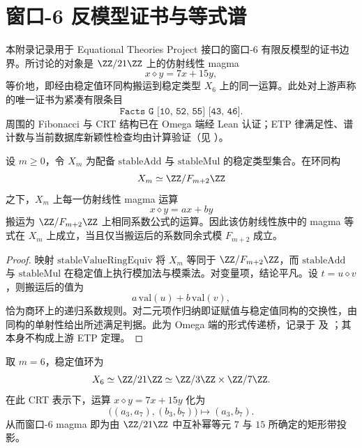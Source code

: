 \documentclass[../../main.tex]{subfiles}
\begin{document}
\section{窗口-6 反模型证书与等式谱}\label{app:window6-countermodel-certificate}

本附录记录用于 Equational Theories Project 接口的窗口-\(6\) 有限反模型的证书边界。所讨论的对象是 \(\ZZ/21\ZZ\) 上的仿射线性 magma
\[
    x\diamond y=7x+15y,
\]
等价地，即经由稳定值环同构搬运到稳定类型 \(X_6\) 上的同一运算。此处对上游声称的唯一证书为紧凑有限条目
\[
    \texttt{Facts G [10, 52, 55] [43, 46]}.
\]
周围的 Fibonacci 与 CRT 结构已在 Omega 端经 Lean 认证；ETP 律满足性、谱计数与当前数据库新颖性检查均由计算验证（见 \texttt{}）。

\begin{lemma}[稳定值仿射传递]\label{lem:window6-affine-stable-transfer}
设 \(m\geq 0\)，令 \(X_m\) 为配备 \(\mathrm{stableAdd}\) 与 \(\mathrm{stableMul}\) 的稳定类型集合。在环同构
\[
    X_m \simeq \ZZ/F_{m+2}\ZZ
\]
之下，\(X_m\) 上每一仿射线性 magma 运算
\[
    x\diamond y=ax+by
\]
搬运为 \(\ZZ/F_{m+2}\ZZ\) 上相同系数公式的运算。因此该仿射线性族中的 magma 等式在 \(X_m\) 上成立，当且仅当搬运后的系数同余式模 \(F_{m+2}\) 成立。
\end{lemma}

\begin{proof}
映射 \(\mathrm{stableValueRingEquiv}\) 将 \(X_m\) 等同于 \(\ZZ/F_{m+2}\ZZ\)，而 \(\mathrm{stableAdd}\) 与 \(\mathrm{stableMul}\) 在稳定值上执行模加法与模乘法。对变量项，结论平凡。设 \(t=u\diamond v\)，则搬运后的值为
\[
    a\,\mathrm{val}(u)+b\,\mathrm{val}(v),
\]
恰为商环上的递归系数规则。对二元项作归纳即证赋值与稳定值同构的交换性，由同构的单射性给出所述满足判据。此为 Omega 端的形式传递桥，记录于
\texttt{} 及
\texttt{}；其本身不构成上游 ETP 定理。
\end{proof}

\begin{proposition}\label{prop:window6-crt-rectangular-band}
取 \(m=6\)，稳定值环为
\[
    X_6\simeq \ZZ/21\ZZ\simeq \ZZ/3\ZZ\times \ZZ/7\ZZ.
\]
在此 CRT 表示下，运算 \(x\diamond y=7x+15y\) 化为
\[
    \bigl((a_3,a_7),(b_3,b_7)\bigr)\longmapsto (a_3,b_7).
\]
从而窗口-\(6\) magma 即为由 \(\ZZ/21\ZZ\) 中互补幂等元 \(7\) 与 \(15\) 所确定的矩形带投影。
\end{proposition}
\end{document}
